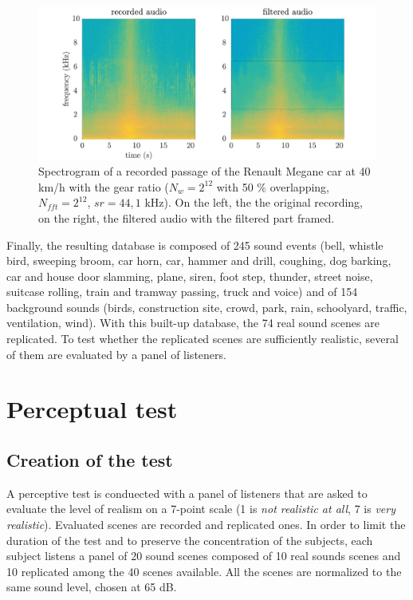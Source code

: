 \documentclass[a4,11pt,twocolumn]{article}
\begin{document}
\begin{figure}[hbtp]
\centering
\includegraphics[width=\linewidth]{./pictures/filtrageMedian_VL1_R3_40_EN.pdf}
\caption{Spectrogram of a recorded passage of the Renault Megane car at 40 km/h with the  gear ratio ($N_{w} = 2^{12}$ with 50 $\%$ overlapping, $N_{fft} = 2^{12}$, $sr = 44,1$ kHz). On the left, the the original recording, on the right, the filtered audio with the filtered part framed.}
\label{fig:filtre_car}
\end{figure}

Finally, the resulting database is composed of 245 sound events (bell, whistle bird, sweeping broom, car horn, car, hammer and drill, coughing, dog barking, car and house door slamming, plane, siren, foot step, thunder, street noise, suitcase rolling, train and tramway passing, truck and voice) and of 154 background sounds (birds, construction site, crowd, park, rain, schoolyard, traffic, ventilation, wind). With this built-up database, the 74 real sound scenes are replicated. To test whether the replicated scenes are sufficiently realistic, several of them are evaluated by a panel of listeners.

\section{Perceptual test} \label{sec:test}
\subsection{Creation of the test}
A perceptive test is conduected with a panel of listeners that are asked to evaluate the level of realism on a 7-point scale (1 is \textit{not realistic at all}, 7 is \textit{very realistic}). Evaluated scenes are  recorded and replicated ones. In order to limit the duration of the test and to preserve the concentration of the subjects, each subject listens a panel of 20 sound scenes composed of 10 real sounds scenes and 10 replicated among the 40 scenes available. All the scenes are normalized to the same sound level, chosen at 65 dB.\\
\end{document}
